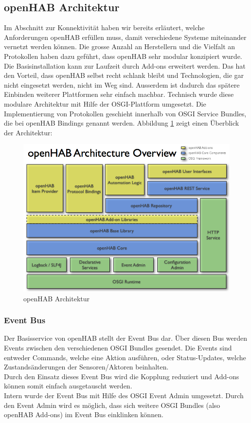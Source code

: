 \subsection{openHAB Architektur}
Im Abschnitt zur Konnektivität haben wir bereits erläutert, welche Anforderungen openHAB erfüllen muss, damit verschiedene Systeme miteinander vernetzt werden können. Die grosse Anzahl an Herstellern und die Vielfalt an Protokollen haben dazu geführt, dass openHAB sehr modular konzipiert wurde. Die Basisinstallation kann zur Laufzeit durch Add-ons erweitert werden. Das hat den Vorteil, dass openHAB selbst recht schlank bleibt und Technologien, die gar nicht eingesetzt werden, nicht im Weg sind. Ausserdem ist dadurch das spätere Einbinden weiterer Plattformen sehr einfach machbar. Technisch wurde diese modulare Architektur mit Hilfe der OSGI-Plattform umgesetzt. Die Implementierung von Protokollen geschieht innerhalb von OSGI Service Bundles, die bei openHAB Bindings genannt werden. Abbildung \ref{fig:ohArch} zeigt einen Überblick der Architektur:

\begin{figure}[H]
	\centering
		\includegraphics[scale=0.45]{report/img/openHAB_architecture}
	\caption{openHAB Architektur}
	\label{fig:ohArch}
\end{figure}

\subsubsection{Event Bus}
Der Basisservice von openHAB stellt der Event Bus dar. Über diesen Bus werden Events zwischen den verschiedenen OSGI Bundles gesendet. Die Events sind entweder Commands, welche eine Aktion ausführen, oder Status-Updates, welche Zustandsänderungen der Sensoren/Aktoren beinhalten. \\
Durch den Einsatz dieses Event Bus wird die Kopplung reduziert und Add-ons können somit einfach ausgetauscht werden. \\
Intern wurde der Event Bus mit Hilfe des OSGI Event Admin umgesetzt. Durch den Event Admin wird es möglich, dass sich weitere OSGI Bundles (also openHAB Add-ons) im Event Bus einklinken können.

